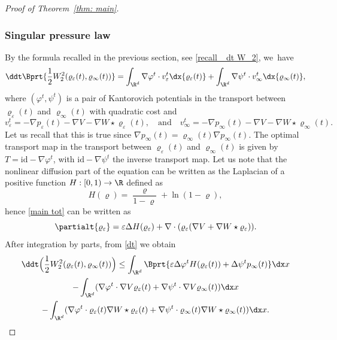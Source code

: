 \begin{proof}[Proof of Theorem~\ref{thm: main}]
\subsubsection*{Singular pressure law}
By the formula recalled in the previous section, see \eqref{recall_ dt W_2}, we~have\enlargethispage{-3\baselineskip}
\begin{equation}\label{dt}
\ddt \Bprt{\frac 12 W_2^2(\varrho_\varepsilon(t), \varrho_\infty(t))} = \int_{\R^d} \nabla \varphi^t \cdot v^t_\varepsilon \dx{\varrho_\varepsilon(t)} + \int_{\R^d} \nabla \psi^t \cdot v^t_\infty \dx{\varrho_\infty(t)},
\end{equation}
where $(\varphi^t, \psi^t)$ is a pair of Kantorovich potentials in the transport between $\varrho_\varepsilon(t)$ and $\varrho_\infty(t)$ with quadratic cost and
\[
v^t_\varepsilon = -\nabla p_\varepsilon(t) - \nabla V - \nabla W \star \varrho_\varepsilon(t),\quad \text{and}\quad v^t_\infty = -\nabla p_\infty(t) - \nabla V - \nabla W \star \varrho_\infty(t).
\]
Let us recall that this is true since $\nabla p_\infty(t) = \varrho_\infty(t)\nabla p_\infty(t)$.
The optimal transport map in the transport between $\varrho_\varepsilon(t)$ and $\varrho_\infty(t)$ is given by $T= \mathrm{id} - \nabla \varphi^t$, with $\mathrm{id} - \nabla \psi^t$ the inverse transport map.
Let us note that the nonlinear diffusion part of the equation can be written as the Laplacian of a positive function $H:[0,1)\to\R$ defined as
\begin{equation}\label{eq: H}
H(\varrho) = \frac{\varrho}{1-\varrho} + \ln (1-\varrho),
\end{equation}
hence \eqref{main tot} can be written as
\begin{equation*}\label{main tot es}
\partialt{\varrho_\varepsilon} = \varepsilon\Delta H(\varrho_\varepsilon)+ \nabla \cdot(\varrho_\varepsilon( \nabla V + \nabla W \star \varrho_\varepsilon)).
\end{equation*}
After integration by parts, from \eqref{dt} we obtain
\begin{multline}\label{dt W2}
\ddt \Bigl(\frac 12 W_2^2(\varrho_\varepsilon(t), \varrho_\infty(t))\Bigr)
\leq \int_{\R^d} \Bprt{\varepsilon \Delta \varphi^t H(\varrho_\varepsilon(t)) +\Delta \psi^t p_\infty(t) }\dx x\\
- \int_{\R^d} (\nabla \varphi^t \cdot \nabla V \varrho_\varepsilon(t) + \nabla \psi^t \cdot \nabla V \varrho_\infty(t)) \dx x\\
- \int_{\R^d} (\nabla \varphi^t \cdot \varrho_\varepsilon(t)\nabla W\star \varrho_\varepsilon(t) +\nabla \psi^t \cdot \varrho_\infty(t)\nabla W\star \varrho_\infty(t)) \dx x.

\end{multline}
\end{proof}
